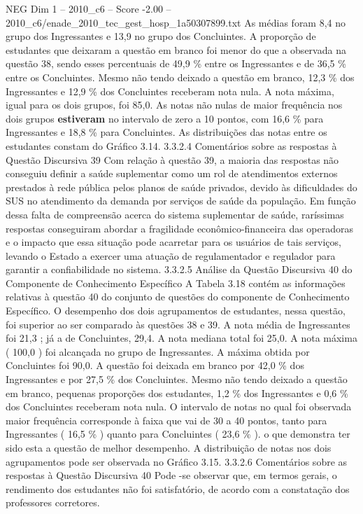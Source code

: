 \begin{textsample}{NEG Dim 1 – 2010\_c6 – Score -2.00 – 2010\_c6/enade\_2010\_tec\_gest\_hosp\_1a50307899.txt}
As médias foram 8,4 no grupo dos Ingressantes e 13,9 no grupo dos Concluintes.
A proporção de estudantes que deixaram a questão em branco foi menor do que a observada na questão 38, sendo esses percentuais de 49,9 \% entre os Ingressantes e de 36,5 \% entre os Concluintes.
Mesmo não tendo deixado a questão em branco, 12,3 \% dos Ingressantes e 12,9 \% dos Concluintes receberam nota nula.
A nota máxima, igual para os dois grupos, foi 85,0.
As notas não nulas de maior frequência nos dois grupos \textbf{estiveram} no intervalo de zero a 10 pontos, com 16,6 \% para Ingressantes e 18,8 \% para Concluintes.
As distribuições das notas entre os estudantes constam do Gráfico 3.14. 3.3.2.4 Comentários sobre as respostas à Questão Discursiva 39 Com relação à questão 39, a maioria das respostas não conseguiu definir a saúde suplementar como um rol de atendimentos externos prestados à rede pública pelos planos de saúde privados, devido às dificuldades do SUS no atendimento da demanda por serviços de saúde da população.
Em função dessa falta de compreensão acerca do sistema suplementar de saúde, raríssimas respostas conseguiram abordar a fragilidade econômico-financeira das operadoras e o impacto que essa situação pode acarretar para os usuários de tais serviços, levando o Estado a exercer uma atuação de regulamentador e regulador para garantir a confiabilidade no sistema. 3.3.2.5 Análise da Questão Discursiva 40 do Componente de Conhecimento Específico A Tabela 3.18 contém as informações relativas à questão 40 do conjunto de questões do componente de Conhecimento Específico.
O desempenho dos dois agrupamentos de estudantes, nessa questão, foi superior ao ser comparado às questões 38 e 39.
A nota média de Ingressantes foi 21,3 ; já a de Concluintes, 29,4.
A nota mediana total foi 25,0.
A nota máxima ( 100,0 ) foi alcançada no grupo de Ingressantes.
A máxima obtida por Concluintes foi 90,0.
A questão foi deixada em branco por 42,0 \% dos Ingressantes e por 27,5 \% dos Concluintes.
Mesmo não tendo deixado a questão em branco, pequenas proporções dos estudantes, 1,2 \% dos Ingressantes e 0,6 \% dos Concluintes receberam nota nula.
O intervalo de notas no qual foi observada maior frequência corresponde à faixa que vai de 30 a 40 pontos, tanto para Ingressantes ( 16,5 \% ) quanto para Concluintes ( 23,6 \% ). o que demonstra ter sido esta a questão de melhor desempenho.
A distribuição de notas nos dois agrupamentos pode ser observada no Gráfico 3.15. 3.3.2.6 Comentários sobre as respostas à Questão Discursiva 40 Pode -se observar que, em termos gerais, o rendimento dos estudantes não foi satisfatório, de acordo com a constatação dos professores corretores.

\end{textsample}
